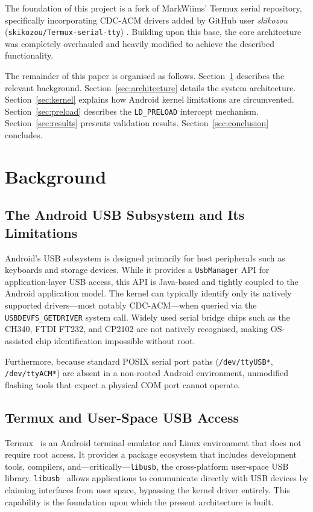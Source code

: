 \documentclass[conference]{IEEEtran}
\begin{document}
The foundation of this project is a fork of MarkWiims' Termux serial repository\cite{markwiims}, specifically incorporating CDC-ACM drivers added by GitHub user \textit{skikozou} (\texttt{skikozou/Termux-serial-tty}) \cite{skikozou}. Building upon this base, the core architecture was completely overhauled and heavily modified to achieve the described functionality.

The remainder of this paper is organised as follows. Section~\ref{sec:background} describes the relevant background. Section~\ref{sec:architecture} details the system architecture. Section~\ref{sec:kernel} explains how Android kernel limitations are circumvented. Section~\ref{sec:preload} describes the \texttt{LD\_PRELOAD} intercept mechanism. Section~\ref{sec:results} presents validation results. Section~\ref{sec:conclusion} concludes.

\section{Background}
\label{sec:background}

\subsection{The Android USB Subsystem and Its Limitations}

Android's USB subsystem is designed primarily for host peripherals such as keyboards and storage devices. While it provides a \texttt{UsbManager} API for application-layer USB access, this API is Java-based and tightly coupled to the Android application model. The kernel can typically identify only its natively supported drivers—most notably CDC-ACM—when queried via the \texttt{USBDEVFS\_GETDRIVER} system call. Widely used serial bridge chips such as the CH340, FTDI FT232, and CP2102 are not natively recognised, making OS-assisted chip identification impossible without root.

Furthermore, because standard POSIX serial port paths (\texttt{/dev/ttyUSB*}, \texttt{/dev/ttyACM*}) are absent in a non-rooted Android environment, unmodified flashing tools that expect a physical COM port cannot operate.

\subsection{Termux and User-Space USB Access}

Termux~\cite{termux} is an Android terminal emulator and Linux environment that does not require root access. It provides a package ecosystem that includes development tools, compilers, and—critically—\texttt{libusb}, the cross-platform user-space USB library. \texttt{libusb}~\cite{libusb} allows applications to communicate directly with USB devices by claiming interfaces from user space, bypassing the kernel driver entirely. This capability is the foundation upon which the present architecture is built.
\end{document}
